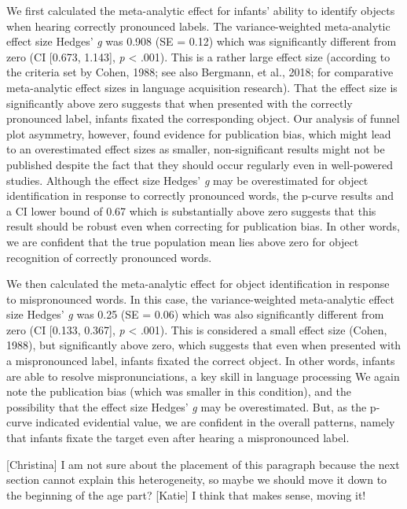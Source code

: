 \documentclass[man]{apa6}
\theoremstyle{definition}
\theoremstyle{definition}
\theoremstyle{definition}
\theoremstyle{remark}
\begin{document}
We first calculated the meta-analytic effect for infants' ability to
identify objects when hearing correctly pronounced labels. The
variance-weighted meta-analytic effect size Hedges' \emph{g} was 0.908
(SE = 0.12) which was significantly different from zero (CI {[}0.673,
1.143{]}, \emph{p} \textless{} .001). This is a rather large effect size
(according to the criteria set by Cohen, 1988; see also Bergmann, et
al., 2018; for comparative meta-analytic effect sizes in language
acquisition research). That the effect size is significantly above zero
suggests that when presented with the correctly pronounced label,
infants fixated the corresponding object. Our analysis of funnel plot
asymmetry, however, found evidence for publication bias, which might
lead to an overestimated effect sizes as smaller, non-significant
results might not be published despite the fact that they should occur
regularly even in well-powered studies. Although the effect size Hedges'
\emph{g} may be overestimated for object identification in response to
correctly pronounced words, the p-curve results and a CI lower bound of
0.67 which is substantially above zero suggests that this result should
be robust even when correcting for publication bias. In other words, we
are confident that the true population mean lies above zero for object
recognition of correctly pronounced words.

We then calculated the meta-analytic effect for object identification in
response to mispronounced words. In this case, the variance-weighted
meta-analytic effect size Hedges' \emph{g} was 0.25 (SE = 0.06) which
was also significantly different from zero (CI {[}0.133, 0.367{]},
\emph{p} \textless{} .001). This is considered a small effect size
(Cohen, 1988), but significantly above zero, which suggests that even
when presented with a mispronounced label, infants fixated the correct
object. In other words, infants are able to resolve mispronunciations, a
key skill in language processing We again note the publication bias
(which was smaller in this condition), and the possibility that the
effect size Hedges' \emph{g} may be overestimated. But, as the p-curve
indicated evidential value, we are confident in the overall patterns,
namely that infants fixate the target even after hearing a mispronounced
label.

{[}Christina{]} I am not sure about the placement of this paragraph
because the next section cannot explain this heterogeneity, so maybe we
should move it down to the beginning of the age part? {[}Katie{]} I
think that makes sense, moving it!
\end{document}
